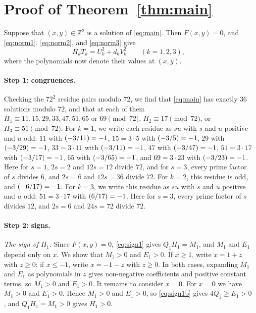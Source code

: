 \documentclass[11pt]{article}
\newcommand{\Z}{\mathbb{Z}}
\newcommand{\leg}[2]{\mathchoice{\biggl(\dfrac{#1}{#2}\biggr)}{(#1/#2)}{(#1/#2)}{(#1/#2)}}
\begin{document}
\section{Proof of Theorem~\ref{thm:main}}

Suppose that $(x,y)\in\Z^2$ is a solution of \eqref{eq:main}. Then $F(x,y)=0$, and \eqref{eq:norm1}, \eqref{eq:norm2}, and \eqref{eq:norm3} give
\begin{equation}\label{eq:HT}
H_kT_k=U_k^2+d_kV_k^2\qquad(k=1,2,3),
\end{equation}
where the polynomials now denote their values at $(x,y)$.

\paragraph{Step 1: congruences.} Checking the $72^2$ residue pairs modulo $72$, we find that \eqref{eq:main} has exactly 36 solutions modulo $72$, and that at each of them $H_{1}\equiv11,\allowbreak 15,\allowbreak 29,\allowbreak 33,\allowbreak 47,\allowbreak 51,\allowbreak 65\text{ or }69\pmod{72}$, $H_{2}\equiv17\pmod{72}$, or $H_{3}\equiv51\pmod{72}$. For $k=1$, we write each residue as $su$ with $s$ and $u$ positive and $u$ odd: $11$ with $\leg{-3}{11}=-1$, $15=3\cdot5$ with $\leg{-3}{5}=-1$, $29$ with $\leg{-3}{29}=-1$, $33=3\cdot11$ with $\leg{-3}{11}=-1$, $47$ with $\leg{-3}{47}=-1$, $51=3\cdot17$ with $\leg{-3}{17}=-1$, $65$ with $\leg{-3}{65}=-1$, and $69=3\cdot23$ with $\leg{-3}{23}=-1$. Here for $s=1$, $2s=2$ and $12s=12$ divide $72$, and for $s=3$, every prime factor of $s$ divides $6$, and $2s=6$ and $12s=36$ divide $72$. For $k=2$, this residue is odd, and $\leg{-6}{17}=-1$. For $k=3$, we write this residue as $su$ with $s$ and $u$ positive and $u$ odd: $51=3\cdot17$ with $\leg{6}{17}=-1$. Here for $s=3$, every prime factor of $s$ divides $12$, and $2s=6$ and $24s=72$ divide $72$.

\paragraph{Step 2: signs.} \emph{The sign of $H_{1}$.} Since $F(x,y)=0$, \eqref{eq:sign1} gives $Q_{1}H_{1}=M_{1}$, and $M_{1}$ and $E_{1}$ depend only on $x$. We show that $M_{1}>0$ and $E_{1}>0$. If $x\geq1$, write $x=1+z$ with $z\geq0$; if $x\leq-1$, write $x=-1-z$ with $z\geq0$. In both cases, expanding $M_{1}$ and $E_{1}$ as polynomials in $z$ gives non-negative coefficients and positive constant terms, so $M_{1}>0$ and $E_{1}>0$. It remains to consider $x=0$. For $x=0$ we have $M_{1}>0$ and $E_{1}>0$. Hence $M_{1}>0$ and $E_{1}>0$, so \eqref{eq:sign1b} gives $4Q_{1}\geq E_{1}>0$, and $Q_{1}H_{1}=M_{1}>0$ gives $H_{1}>0$.
\end{document}
